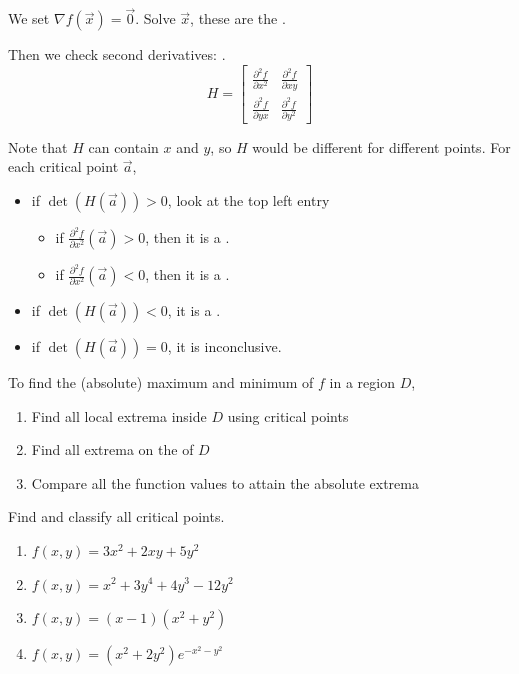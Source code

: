 \documentclass[11pt,fleqn]{book} %
\begin{document}
We set $\nabla f(\vec{x}) = \vec{0}$. Solve $\vec{x}$, these are the .

Then we check second derivatives: .
$$H = \begin{bmatrix}
    \frac{\partial^2 f}{\partial x^2} & \frac{\partial^2 f}{\partial xy}  \\
    \frac{\partial^2 f}{\partial yx}  & \frac{\partial^2 f}{\partial y^2}
\end{bmatrix}$$

Note that $H$ can contain $x$ and $y$, so $H$ would be different for different points. For each critical point $\vec{a}$, 
\begin{itemize}
    \item if $\det(H(\vec{a})) > 0$, look at the top left entry
    
    \begin{itemize}
        \item if $\frac{\partial^2 f}{\partial x^2}(\vec{a}) > 0$,  then it is a .
        \item if $\frac{\partial^2 f}{\partial x^2}(\vec{a}) < 0$,  then it is a .
    \end{itemize}

    \item if $\det(H(\vec{a})) < 0$, it is a . 

    \item if $\det(H(\vec{a})) = 0$, it is inconclusive. 
\end{itemize}

To find the (absolute) maximum and minimum of $f$ in a region $D$, 
\begin{enumerate}
    \item Find all local extrema inside $D$ using critical points
    \item Find all extrema on the  of $D$ 
    \item Compare all the function values to attain the absolute extrema
\end{enumerate}

\begin{exercise}
    Find and classify all critical points.

    \begin{enumerate}
        \item $f(x,y) = 3x^2 + 2xy + 5y^2$
        \item $f(x,y) = x^2 + 3y^4 + 4y^3 - 12y^2$
        \item $f(x,y) = (x - 1)(x^2 + y^2)$
        \item $f(x,y) = (x^2 + 2y^2)e^{-x^2 - y^2}$
    \end{enumerate}
\end{exercise}
\end{document}
